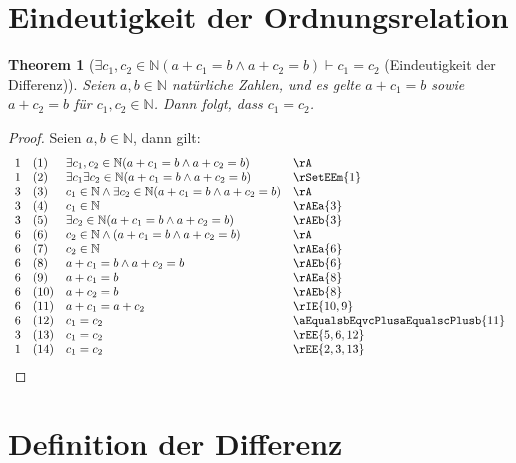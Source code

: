 \documentclass{book}
\theoremstyle{plain}
\newtheorem{theorem}{Theorem}
\theoremstyle{remark}
\theoremstyle{definition}
\begin{document}
\section{Eindeutigkeit der Ordnungsrelation}

\label{ExcSubOnewcSubTwoInNaturalLpaPluscSubOneEqualsbAndaPluscSubTwoEqualsbRpImpcSubOneEqualscSubTwo}
\begin{theorem}[\(\exists c_1, c_2 \in \mathbb{N} (a + c_1 = b \land a + c_2 = b) \vdash c_1 = c_2\) (Eindeutigkeit der Differenz)]
    Seien \( a, b \in \mathbb{N} \) natürliche Zahlen, und es gelte \( a + c_1 = b \) sowie \( a + c_2 = b \) für \( c_1, c_2 \in \mathbb{N} \). Dann folgt, dass \( c_1 = c_2 \).
\end{theorem}
\begin{proof}
    Seien \(a,b\in\mathbb{N}\), dann gilt:
        \[
	\begin{array}{llll}
            1   &  (1) & \exists c_1,c_2\in \mathbb{N}(a+c_1=b\land a+c_2=b) & \rA \\
            1   &  (2) & \exists c_1\exists c_2\in \mathbb{N}(a+c_1=b\land a+c_2=b) & \rSetEEm{1} \\
            3   &  (3) & c_1\in\mathbb{N}\land \exists c_2\in \mathbb{N}(a+c_1=b\land a+c_2=b) & \rA \\
            3   &  (4) & c_1\in\mathbb{N} & \rAEa{3} \\
            3   &  (5) & \exists c_2\in \mathbb{N}(a+c_1=b\land a+c_2=b) & \rAEb{3} \\
            6   &  (6) & c_2\in\mathbb{N}\land (a+c_1=b\land a+c_2=b) & \rA \\
            6   &  (7) & c_2\in\mathbb{N} & \rAEa{6} \\
            6   &  (8) & a+c_1=b\land a+c_2=b & \rAEb{6} \\
            6   &  (9) & a+c_1=b & \rAEa{8} \\
            6   &  (10) & a+c_2=b & \rAEb{8} \\
            6   &  (11) & a+c_1=a+c_2 & \rIE{10,9} \\
            6   &  (12) & c_1=c_2 & \aEqualsbEqvcPlusaEqualscPlusb{11} \\
            3   &  (13) & c_1=c_2 & \rEE{5,6,12} \\
            1   &  (14) & c_1=c_2 & \rEE{2,3,13} \\
    \end{array}
	\]
\end{proof}

\section{Definition der Differenz}
\end{document}
